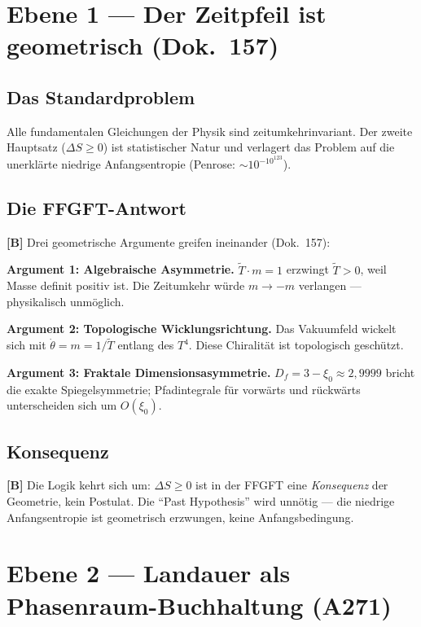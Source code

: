 \section{Ebene 1 --- Der Zeitpfeil ist geometrisch (Dok.~157)}

\subsection{Das Standardproblem}

Alle fundamentalen Gleichungen der Physik sind zeitumkehrinvariant.
Der zweite Hauptsatz ($\Delta S \ge 0$) ist statistischer Natur
und verlagert das Problem auf die unerklärte niedrige Anfangsentropie
(Penrose: $\sim 10^{-10^{123}}$).

\subsection{Die FFGFT-Antwort}

\textbf{[B]} Drei geometrische Argumente greifen ineinander (Dok.~157):

\textbf{Argument 1: Algebraische Asymmetrie.}
$\tilde{T} \cdot m = 1$ erzwingt $\tilde{T} > 0$, weil Masse definit
positiv ist. Die Zeitumkehr würde $m \to -m$ verlangen ---
physikalisch unmöglich.

\textbf{Argument 2: Topologische Wicklungsrichtung.}
Das Vakuumfeld wickelt sich mit $\dot\theta = m = 1/\tilde{T}$
entlang des $T^4$. Diese Chiralität ist topologisch geschützt.

\textbf{Argument 3: Fraktale Dimensionsasymmetrie.}
$D_f = 3 - \xi_0 \approx 2{,}9999$ bricht die exakte Spiegelsymmetrie;
Pfadintegrale für vorwärts und rückwärts unterscheiden sich um
$O(\xi_0)$.

\subsection{Konsequenz}

\textbf{[B]} Die Logik kehrt sich um: $\Delta S \ge 0$ ist in der FFGFT
eine \emph{Konsequenz} der Geometrie, kein Postulat. Die
\enquote{Past Hypothesis} wird unnötig --- die niedrige Anfangsentropie
ist geometrisch erzwungen, keine Anfangsbedingung.

\section{Ebene 2 --- Landauer als Phasenraum-Buchhaltung (A271)}

